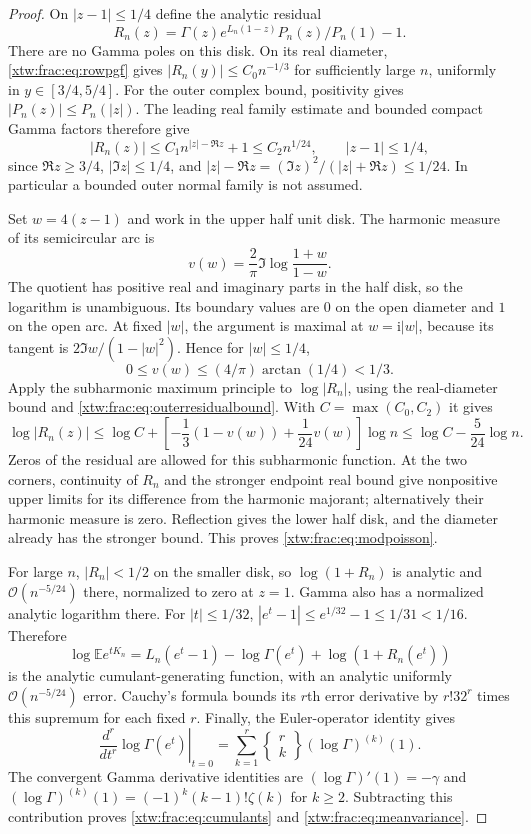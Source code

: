 \documentclass[11pt]{article}
\theoremstyle{remark}\newtheorem{remark}[theorem]{Remark}
\newcommand{\OO}{\mathcal O}
\newcommand{\E}{\mathbb E}
\newcommand{\ii}{\mathrm i}
\begin{document}
\begin{proof}
On $|z-1|\le1/4$ define the analytic residual
\[
 R_n(z)=\Gamma(z)e^{L_n(1-z)}P_n(z)/P_n(1)-1.
\]
There are no Gamma poles on this disk. On its real diameter,
\eqref{xtw:frac:eq:rowpgf} gives $|R_n(y)|\le C_0n^{-1/3}$ for sufficiently
large $n$, uniformly in $y\in[3/4,5/4]$.
For the outer complex bound, positivity gives
$|P_n(z)|\le P_n(|z|)$. The leading real family estimate and bounded
compact Gamma factors therefore give
\begin{equation}\label{xtw:frac:eq:outerresidualbound}
 |R_n(z)|\le C_1n^{|z|-\Re z}+1\le C_2n^{1/24},
 \qquad |z-1|\le1/4,
\end{equation}
since $\Re z\ge3/4$, $|\Im z|\le1/4$, and
$|z|-\Re z=(\Im z)^2/(|z|+\Re z)\le1/24$.
In particular a bounded outer normal family is not assumed.

Set $w=4(z-1)$ and work in the upper half unit disk. The harmonic measure
of its semicircular arc is
\[
 v(w)=\frac2\pi\Im\log\frac{1+w}{1-w}.
\]
The quotient has positive real and imaginary parts in the half disk,
so the logarithm is unambiguous. Its boundary values are $0$ on the
open diameter and $1$ on the open arc. At fixed $|w|$, the argument is
maximal at $w=\ii|w|$, because its tangent is
$2\Im w/(1-|w|^2)$. Hence for $|w|\le1/4$,
\[
 0\le v(w)\le(4/\pi)\arctan(1/4)<1/3.
\]
Apply the subharmonic maximum principle to $\log|R_n|$, using the
real-diameter bound and \eqref{xtw:frac:eq:outerresidualbound}. With
$C=\max(C_0,C_2)$ it gives
\[
 \log|R_n(z)|\le\log C+
     \left[-\frac13(1-v(w))+\frac1{24}v(w)\right]\log n
 \le\log C-\frac5{24}\log n.
\]
Zeros of the residual are allowed for this subharmonic function.
At the two corners, continuity of $R_n$ and the stronger endpoint real
bound give nonpositive upper limits for its difference from the harmonic
majorant; alternatively their harmonic measure is zero. Reflection gives
the lower half disk, and the diameter already has the stronger bound.
This proves \eqref{xtw:frac:eq:modpoisson}.

For large $n$, $|R_n|<1/2$ on the smaller disk, so
$\log(1+R_n)$ is analytic and $\OO(n^{-5/24})$ there, normalized to
zero at $z=1$. Gamma also has a normalized analytic logarithm there.
For $|t|\le1/32$,
$|e^t-1|\le e^{1/32}-1\le1/31<1/16$. Therefore
\[
 \log\E e^{tK_n}=L_n(e^t-1)-\log\Gamma(e^t)
                       +\log(1+R_n(e^t))
\]
is the analytic cumulant-generating function, with an analytic uniformly
$\OO(n^{-5/24})$ error. Cauchy's formula bounds its $r$th error derivative
by $r!32^r$ times this supremum for each fixed $r$.
Finally, the Euler-operator identity gives
\[
 \left.\frac{d^r}{dt^r}\log\Gamma(e^t)\right|_{t=0}
 =\sum_{k=1}^r\left\{\!\begin{matrix}r\\k\end{matrix}\!\right\}
                         (\log\Gamma)^{(k)}(1).
\]
The convergent Gamma derivative identities \cite{dlmfgamma} are
$(\log\Gamma)'(1)=-\gamma$ and
$(\log\Gamma)^{(k)}(1)=(-1)^k(k-1)!\zeta(k)$ for $k\ge2$.
Subtracting this contribution proves \eqref{xtw:frac:eq:cumulants} and
\eqref{xtw:frac:eq:meanvariance}.
\end{proof}
\end{document}
